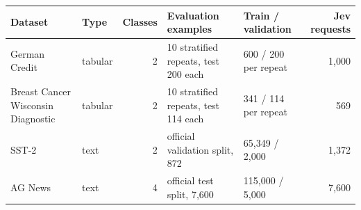 \begin{tabular}{llrllr}
\toprule
Dataset & Type & Classes & Evaluation examples & Train / validation & Jev requests \\
\midrule
German Credit & tabular & 2 & 10 stratified repeats, test 200 each & 600 / 200 per repeat & 1{,}000 \\
Breast Cancer Wisconsin Diagnostic & tabular & 2 & 10 stratified repeats, test 114 each & 341 / 114 per repeat & 569 \\
SST-2 & text & 2 & official validation split, 872 & 65{,}349 / 2{,}000 & 1{,}372 \\
AG News & text & 4 & official test split, 7{,}600 & 115{,}000 / 5{,}000 & 7{,}600 \\
\bottomrule
\end{tabular}
